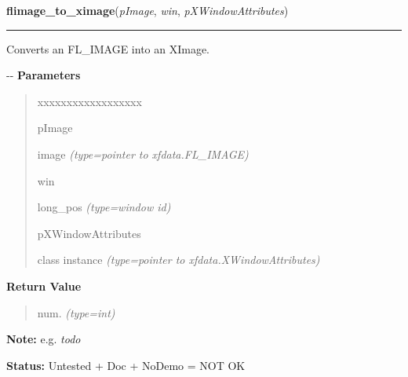 \hspace{.8\funcindent}\begin{boxedminipage}{\funcwidth}

    \raggedright \textbf{flimage\_to\_ximage}(\textit{pImage}, \textit{win}, \textit{pXWindowAttributes})

    \vspace{-1.5ex}

    \rule{\textwidth}{0.5\fboxrule}
\setlength{\parskip}{2ex}

Converts an FL\_IMAGE into an XImage.

-{}-
\setlength{\parskip}{1ex}
      \textbf{Parameters}
      \vspace{-1ex}

      \begin{quote}
        \begin{Ventry}{xxxxxxxxxxxxxxxxxx}

          \item[pImage]


image
            {\it (type=pointer to xfdata.FL\_IMAGE)}

          \item[win]


long\_pos
            {\it (type=window id)}

          \item[pXWindowAttributes]


class instance
            {\it (type=pointer to xfdata.XWindowAttributes)}

        \end{Ventry}

      \end{quote}

      \textbf{Return Value}
    \vspace{-1ex}

      \begin{quote}

num.
      {\it (type=int)}

      \end{quote}

\textbf{Note:} 
e.g. \emph{todo}


\textbf{Status:} 
Untested + Doc + NoDemo = NOT OK


    \end{boxedminipage}

    \label{xformslib:flflimage:flimage_write_annotation}

